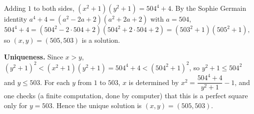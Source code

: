 Adding $1$ to both sides, $(x^2+1)(y^2+1)=504^4+4$. By the Sophie Germain identity $a^4+4=(a^2-2a+2)(a^2+2a+2)$ with $a=504$,
\[
504^4+4=(504^2-2\cdot504+2)(504^2+2\cdot504+2)=(503^2+1)(505^2+1),
\]
so $(x,y)=(505,503)$ is a solution.

\textbf{Uniqueness.} Since $x>y$, $(y^2+1)^2<(x^2+1)(y^2+1)=504^4+4<(504^2+1)^2$, so $y^2+1\le504^2$ and $y\le503$. For each $y$ from $1$ to $503$, $x$ is determined by $x^2=\dfrac{504^4+4}{y^2+1}-1$, and one checks (a finite computation, done by computer) that this is a perfect square only for $y=503$. Hence the unique solution is $\boxed{(x,y)=(505,503)}$.
